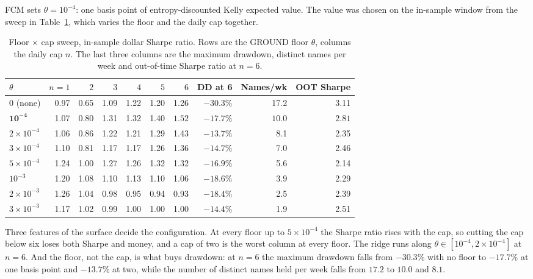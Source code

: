 \documentclass[11pt]{article}
\begin{document}
FCM sets $\theta = 10^{-4}$: one basis point of entropy-discounted Kelly
expected value. The value was chosen on the in-sample window from the sweep in
Table~\ref{tab:grid}, which varies the floor and the daily cap together.

\begin{table}[h]
\centering
\caption{Floor $\times$ cap sweep, in-sample dollar Sharpe ratio. Rows are the
GROUND floor $\theta$, columns the daily cap $n$. The last three columns are
the maximum drawdown, distinct names per week and out-of-time Sharpe ratio at
$n = 6$.}
\label{tab:grid}
\begin{tabular}{lrrrrrrrrr}
\toprule
$\theta$ & $n{=}1$ & $2$ & $3$ & $4$ & $5$ & $6$ & DD at 6 & Names/wk & OOT Sharpe \\
\midrule
$0$ (none)      & 0.97 & 0.65 & 1.09 & 1.22 & 1.20 & 1.26 & $-30.3\%$ & 17.2 & 3.11 \\
$\mathbf{10^{-4}}$ & 1.07 & 0.80 & 1.31 & 1.32 & 1.40 & $\mathbf{1.52}$ & $\mathbf{-17.7\%}$ & $\mathbf{10.0}$ & $\mathbf{2.81}$ \\
$2\times10^{-4}$ & 1.06 & 0.86 & 1.22 & 1.21 & 1.29 & 1.43 & $-13.7\%$ & 8.1 & 2.35 \\
$3\times10^{-4}$ & 1.10 & 0.81 & 1.17 & 1.17 & 1.26 & 1.36 & $-14.7\%$ & 7.0 & 2.46 \\
$5\times10^{-4}$ & 1.24 & 1.00 & 1.27 & 1.26 & 1.32 & 1.32 & $-16.9\%$ & 5.6 & 2.14 \\
$10^{-3}$        & 1.20 & 1.08 & 1.10 & 1.13 & 1.10 & 1.06 & $-18.6\%$ & 3.9 & 2.29 \\
$2\times10^{-3}$ & 1.26 & 1.04 & 0.98 & 0.95 & 0.94 & 0.93 & $-18.4\%$ & 2.5 & 2.39 \\
$3\times10^{-3}$ & 1.17 & 1.02 & 0.99 & 1.00 & 1.00 & 1.00 & $-14.4\%$ & 1.9 & 2.51 \\
\bottomrule
\end{tabular}
\end{table}

Three features of the surface decide the configuration. At every floor up to
$5\times10^{-4}$ the Sharpe ratio rises with the cap, so cutting the cap below
six loses both Sharpe and money, and a cap of two is the worst column at every
floor. The ridge runs along $\theta \in [10^{-4}, 2\times10^{-4}]$ at $n = 6$.
And the floor, not the cap, is what buys drawdown: at $n = 6$ the maximum
drawdown falls from $-30.3\%$ with no floor to $-17.7\%$ at one basis point
and $-13.7\%$ at two, while the number of distinct names held per week falls
from $17.2$ to $10.0$ and $8.1$.
\end{document}
